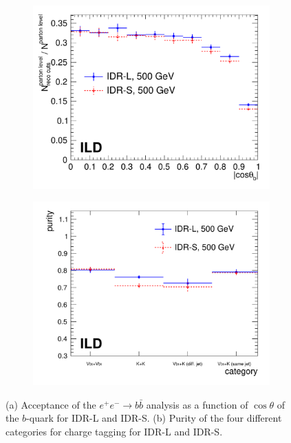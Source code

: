\begin{figure}[htbp]
\begin{subfigure}{0.49\hsize} 
\includegraphics[width=\textwidth]{Performance/fig/acceptance_2models_v2.pdf}
 \caption{ \label{fig:bbbar:effipur:effi}}
 \end{subfigure}
\begin{subfigure}{0.49\hsize} 
\includegraphics[width=\textwidth]{Performance/fig/purity_v2.pdf}
 \caption{  \label{fig:bbbar:effipur:pur}}
 \end{subfigure}
\caption{
(a) Acceptance of the $e^+e^- \to b\bar{b}$ analysis as a function of $\cos{\theta}$ of the $b$-quark for IDR-L and IDR-S.
(b) Purity of the four different categories for charge tagging for IDR-L and IDR-S. 
}
\label{fig:bbbar:effipur}
\end{figure}

